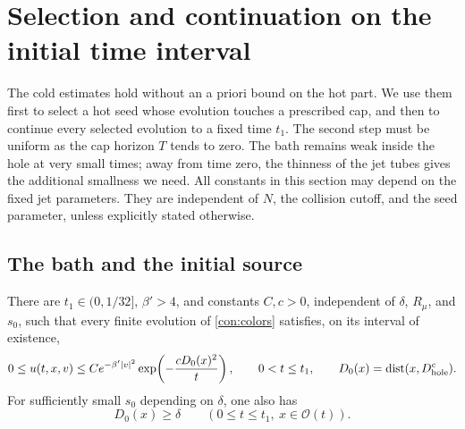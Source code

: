 \section{Selection and continuation on the initial time interval}
\label{sec:early}

The cold estimates hold without an a priori bound on the hot part.
We use them first to select a hot seed whose evolution touches a prescribed
cap, and then to continue every selected evolution to a fixed time $t_1$.
The second step must be uniform as the cap horizon $T$ tends to zero.
The bath remains weak inside the hole at very small times; away from time
zero, the thinness of the jet tubes gives the additional smallness we need.
All constants in this section may depend on the fixed jet parameters.
They are independent of $N$, the collision cutoff, and the seed parameter,
unless explicitly stated otherwise.

\subsection{The bath and the initial source}

\begin{lemma}\label{early:bath}
There are $t_1\in(0,1/32]$, $\beta'>4$, and constants $C,c>0$,
independent of $\delta$, $R_\mu$, and $s_0$, such that every finite evolution
of \eqref{con:colors} satisfies, on its interval of existence,
\begin{equation}\label{early:bath-bound}
 0\le u(t,x,v)\le C e^{-\beta'|v|^2}
       \exp\!\left(-\frac{cD_0(x)^2}{t}\right),
 \qquad 0<t\le t_1,
 \qquad D_0(x)=\operatorname{dist}(x,D_{\rm hole}^c).
\end{equation}
For sufficiently small $s_0$ depending on $\delta$, one also has
\begin{equation}\label{early:hole-distance}
 D_0(x)\ge\delta
 \qquad (0\le t\le t_1,\ x\in\mathcal O(t)).
\end{equation}
\end{lemma}

